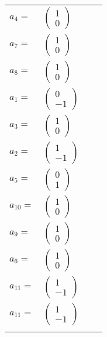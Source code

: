 \documentclass[1p]{elsarticle_modified}
\theoremstyle{definition}
\begin{document}
\begin{tabular}{m{7pt} m{180pt} m{7pt} m{180pt} }
\flushright $a_{4}=$&$\begin{pmatrix}1\\0\end{pmatrix}$ \\
\flushright $a_{7}=$&$\begin{pmatrix}1\\0\end{pmatrix}$ \\
\flushright $a_{8}=$&$\begin{pmatrix}1\\0\end{pmatrix}$ \\
\flushright $a_{1}=$&$\begin{pmatrix}0\\-1\end{pmatrix}$ \\
\flushright $a_{3}=$&$\begin{pmatrix}1\\0\end{pmatrix}$ \\
\flushright $a_{2}=$&$\begin{pmatrix}1\\-1\end{pmatrix}$ \\
\flushright $a_{5}=$&$\begin{pmatrix}0\\1\end{pmatrix}$ \\
\flushright $a_{10}=$&$\begin{pmatrix}1\\0\end{pmatrix}$ \\
\flushright $a_{9}=$&$\begin{pmatrix}1\\0\end{pmatrix}$ \\
\flushright $a_{6}=$&$\begin{pmatrix}1\\0\end{pmatrix}$ \\
\flushright $a_{11}=$&$\begin{pmatrix}1\\-1\end{pmatrix}$\\ \flushright $a_{11}=$&$\begin{pmatrix}1\\-1\end{pmatrix}$\\&\end{tabular}
\end{document}
